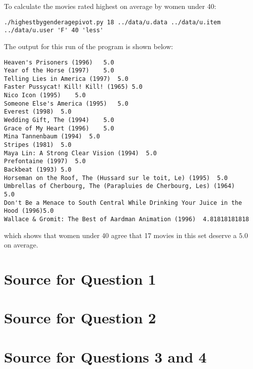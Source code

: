 \documentclass[letterpaper,11pt]{article}
\begin{document}
To calculate the movies rated highest on average by women under 40:
\begin{lstlisting}[frame=single]
./highestbygenderagepivot.py 18 ../data/u.data ../data/u.item ../data/u.user 'F' 40 'less'
\end{lstlisting}

The output for this run of the program is shown below:
\begin{lstlisting}[frame=single]
Heaven's Prisoners (1996)	5.0
Year of the Horse (1997)	5.0
Telling Lies in America (1997)	5.0
Faster Pussycat! Kill! Kill! (1965)	5.0
Nico Icon (1995)	5.0
Someone Else's America (1995)	5.0
Everest (1998)	5.0
Wedding Gift, The (1994)	5.0
Grace of My Heart (1996)	5.0
Mina Tannenbaum (1994)	5.0
Stripes (1981)	5.0
Maya Lin: A Strong Clear Vision (1994)	5.0
Prefontaine (1997)	5.0
Backbeat (1993)	5.0
Horseman on the Roof, The (Hussard sur le toit, Le) (1995)	5.0
Umbrellas of Cherbourg, The (Parapluies de Cherbourg, Les) (1964)	5.0
Don't Be a Menace to South Central While Drinking Your Juice in the Hood (1996)5.0
Wallace & Gromit: The Best of Aardman Animation (1996)	4.81818181818
\end{lstlisting}
which shows that women under 40 agree that 17 movies in this set deserve a $5.0$ on average.

\clearpage
\appendix
\section{Source for Question 1}



\clearpage
\appendix
\section{Source for Question 2}



\clearpage
\appendix
\section{Source for Questions 3 and 4}
\end{document}
